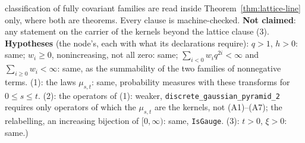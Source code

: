 \begin{proposition}
{classification of fully covariant families are read inside Theorem~\ref{thm:lattice-line} only,
where both are theorems. Every clause is machine-checked. \textbf{Not claimed}: any statement on
the carrier of the kernels beyond the lattice clause (3). \textbf{Hypotheses} (the node's, each
with what its declarations require): $q > 1$, $h > 0$: same; $w_i \ge 0$, nonincreasing, not all
zero: same; $\sum_{i<0}w_iq^{2i} < \infty$ and $\sum_{i \ge 0}w_i < \infty$: same, as the
summability of the two families of nonnegative terms. (1): the laws $\mu_{s,t}$: same,
probability measures with these transforms for $0 \le s \le t$. (2): the operators of (1): weaker,
\texttt{discrete\_gaussian\_pyramid\_2} requires only operators of which the $\mu_{s,t}$ are the
kernels, not (A1)--(A7); the relabelling, an increasing bijection of $[0,\infty)$: same,
\texttt{IsGauge}. (3): $t > 0$, $\xi > 0$: same.)}
\end{proposition}

